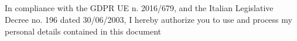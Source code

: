 \documentclass[10pt,a4paper,ragged2e,withhyper]{altacv}
\begin{document}
\begin{paracol}{2}
\\
 

\divider\smallskip
\\


\divider\smallskip
\\
 \\





\divider

\divider


\medskip











\switchcolumn
\newpage


In compliance with the GDPR UE n. 2016/679, 
and the Italian Legislative Decree no. 196 dated 30/06/2003, 
I hereby authorize you to use and process my personal details contained in this document
\\


\end{paracol}
\end{document}
